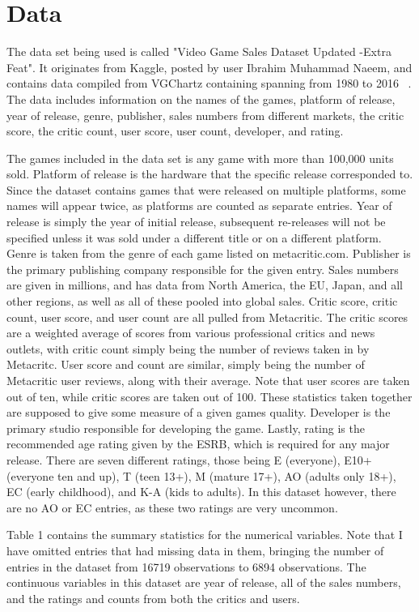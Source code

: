 \documentclass[12pt]{article}
\begin{document}
\section{Data}
\label{sec:data}
The data set being used is called "Video Game Sales Dataset Updated -Extra Feat". It originates from Kaggle, posted by user 
Ibrahim Muhammad Naeem, and contains data compiled from VGChartz containing spanning from 1980 to 2016 ~\citep[(D)][]{maindataset}. 
The data includes information on the names of the games, platform of release, year of  release, genre, publisher, sales numbers 
from different markets, the critic score, the critic count, user score, user count, developer, and rating.

The games included in the data set is any game with more than 100,000 units sold. Platform of release is the hardware that the specific release corresponded to. 
Since the dataset contains games that were released on multiple platforms, some names will appear twice, as platforms are counted as separate entries.
Year of release is simply the year of initial release, subsequent re-releases will not be specified unless 
it was sold under a different title or on a different platform. Genre is taken from the genre of each game listed on metacritic.com. 
Publisher is the primary publishing company responsible for the given entry. Sales numbers are given in millions, and has data from North 
America, the EU, Japan, and all other regions, as well as all of these pooled into global sales. Critic score, critic count, user score, and user count are 
all pulled from Metacritic. The critic scores are a weighted average of scores from various professional critics and news outlets, with 
critic count simply being the number of reviews taken in by Metacritc. User score and count are similar, simply being the number of 
Metacritic user reviews, along with their average. Note that user scores are taken out of ten, while critic scores are taken out of 100. These statistics taken together are supposed to give some measure of a given games 
quality. Developer is the primary studio responsible for developing the game. Lastly, rating is the recommended age rating given by 
the ESRB, which is required for any major release. There are seven different ratings, those being E (everyone), E10+ (everyone ten and up), 
T (teen 13+), M (mature 17+), AO (adults only 18+), EC (early childhood), and K-A (kids to adults). In this dataset however, there
are no AO or EC entries, as these two ratings are very uncommon.

Table 1 contains the summary statistics for the numerical variables. Note that I have omitted entries that had missing data in them, bringing the number of 
entries in the dataset from 16719 observations to 6894 observations. The continuous variables in this dataset are year of release, all of the sales 
numbers, and the ratings and counts from both the critics and users.
\end{document}
